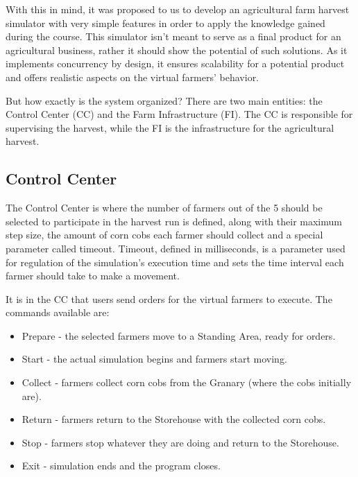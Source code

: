 \documentclass[12pt]{article}
\begin{document}
With this in mind, it was proposed to us to develop an agricultural farm harvest simulator with very simple features in order to apply the knowledge gained 
during the course.
This simulator isn't meant to serve as a final product for an agricultural business, rather it should show the potential of such solutions.
As it implements concurrency by design, it ensures scalability for a potential product and offers realistic aspects on the virtual farmers' behavior.

But how exactly is the system organized?
There are two main entities: the Control Center (CC) and the Farm Infrastructure (FI). 
The CC is responsible for supervising the harvest, while the FI is the infrastructure for the agricultural harvest.

\subsection{Control Center} %

The Control Center is where the number of farmers out of the 5 should be selected to participate in the harvest run is defined, along with their maximum step size, the amount of corn cobs each farmer should collect and a special parameter called timeout.
Timeout, defined in milliseconds, is a parameter used for regulation of the simulation's execution time and sets the time interval each farmer should take to make a movement.

It is in the CC that users send orders for the virtual farmers to execute.
The commands available are:
\vspace{-10pt}
\begin{itemize}[noitemsep]
  \item Prepare - the selected farmers move to a Standing Area, ready for orders.
  \item Start - the actual simulation begins and farmers start moving.
  \item Collect - farmers collect corn cobs from the Granary (where the cobs initially are).
  \item Return - farmers return to the Storehouse with the collected corn cobs.
  \item Stop - farmers stop whatever they are doing and return to the Storehouse.
  \item Exit - simulation ends and the program closes.
\end{itemize}
\vspace{-10pt}
\end{document}
